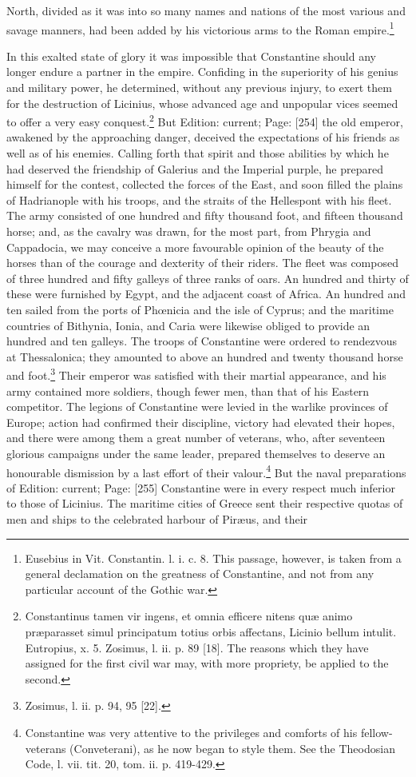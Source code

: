 North, divided as it was into so many names and nations of the most various and savage manners, had been added by his victorious arms to the Roman empire.\footnote{Eusebius in Vit. Constantin. l. i. c. 8. This passage, however, is taken from a general declamation on the greatness of Constantine, and not from any particular account of the Gothic war.}

In this exalted state of glory it was impossible that Constantine should any longer endure a partner in the empire. Confiding in the superiority of his genius and military power, he determined, without any previous injury, to exert them for the destruction of Licinius, whose advanced age and unpopular vices seemed to offer a very easy conquest.\footnote{Constantinus tamen vir ingens, et omnia efficere nitens quæ animo præparasset simul principatum totius orbis affectans, Licinio bellum intulit. Eutropius, x. 5. Zosimus, l. ii. p. 89 [18]. The reasons which they have assigned for the first civil war may, with more propriety, be applied to the second.} But Edition: current; Page: [254] the old emperor, awakened by the approaching danger, deceived the expectations of his friends as well as of his enemies. Calling forth that spirit and those abilities by which he had deserved the friendship of Galerius and the Imperial purple, he prepared himself for the contest, collected the forces of the East, and soon filled the plains of Hadrianople with his troops, and the straits of the Hellespont with his fleet. The army consisted of one hundred and fifty thousand foot, and fifteen thousand horse; and, as the cavalry was drawn, for the most part, from Phrygia and Cappadocia, we may conceive a more favourable opinion of the beauty of the horses than of the courage and dexterity of their riders. The fleet was composed of three hundred and fifty galleys of three ranks of oars. An hundred and thirty of these were furnished by Egypt, and the adjacent coast of Africa. An hundred and ten sailed from the ports of Phœnicia and the isle of Cyprus; and the maritime countries of Bithynia, Ionia, and Caria were likewise obliged to provide an hundred and ten galleys. The troops of Constantine were ordered to rendezvous at Thessalonica; they amounted to above an hundred and twenty thousand horse and foot.\footnote{Zosimus, l. ii. p. 94, 95 [22].} Their emperor was satisfied with their martial appearance, and his army contained more soldiers, though fewer men, than that of his Eastern competitor. The legions of Constantine were levied in the warlike provinces of Europe; action had confirmed their discipline, victory had elevated their hopes, and there were among them a great number of veterans, who, after seventeen glorious campaigns under the same leader, prepared themselves to deserve an honourable dismission by a last effort of their valour.\footnote{Constantine was very attentive to the privileges and comforts of his fellow-veterans (Conveterani), as he now began to style them. See the Theodosian Code, l. vii. tit. 20, tom. ii. p. 419-429.} But the naval preparations of Edition: current; Page: [255] Constantine were in every respect much inferior to those of Licinius. The maritime cities of Greece sent their respective quotas of men and ships to the celebrated harbour of Piræus, and their 
